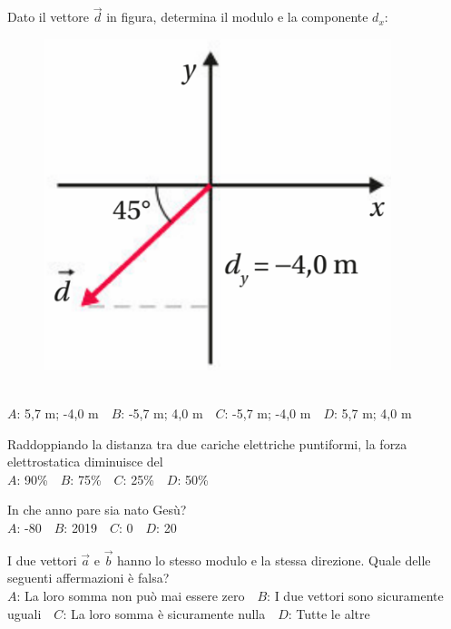 \mcquestionheader Dato il vettore $\vec{d}$ in figura, determina il modulo e la componente $d_x$: \begin{figure}[h!]   \begin{center}     \includegraphics[scale=0.35]{vettored.png}   \end{center} \end{figure}\\
{$A$}: 5,7 m; -4,0 m\ \ {$B$}: -5,7 m; 4,0 m\ \ {$C$}: -5,7 m; -4,0 m\ \ {$D$}: 5,7 m; 4,0 m\ \ 

\mcquestionfooter



\def\mcquestionnumber{7}


\mcquestionheader Raddoppiando la distanza tra due cariche elettriche puntiformi, la forza elettrostatica diminuisce del\\
{$A$}: 90\%\ \ {$B$}: 75\%\ \ {$C$}: 25\%\ \ {$D$}: 50\%\ \ 

\mcquestionfooter



\def\mcquestionnumber{8}


\mcquestionheader In che anno pare sia nato Gesù?\\
{$A$}: -80\ \ {$B$}: 2019\ \ {$C$}: 0\ \ {$D$}: 20\ \ 

\mcquestionfooter



\def\mcquestionnumber{9}


\mcquestionheader I due vettori $\vec{a}$ e $\vec{b}$ hanno lo stesso modulo e la stessa direzione. Quale delle seguenti affermazioni è falsa?\\
{$A$}: La loro somma non può mai essere zero\ \ {$B$}: I due vettori sono sicuramente uguali\ \ {$C$}: La loro somma è sicuramente nulla\ \ {$D$}: Tutte le altre\ \ 

